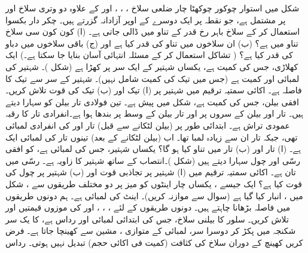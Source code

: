 شکل  میں استوار  چوکور  چوکھٹا  چار ضلعی سلاخ ، ، ، اور  کے علاوہ دو وتری سلاخ  اور  پر مشتمل ہے، جو   نقطہ  پر ایک دوسرے  کے اوپر  آزادانہ گزرتے ہیں۔ چکر دار بکسوا  استعمال کر کے سلاخ    باہر رخ   قدر کے تناو  میں ڈالی جاتی ہے۔ (ا)  کون کون سی سلاخ تناو میں ہے؟ (ب)  ان سلاخوں میں تناو کی قدر کیا ہے اور (ج)  باقی سلاخوں میں  دباو کی قدر کیا ہے؟ ( تشاکل استعمال کر کے مسئلہ انتہائی آسان بنایا جا سکتا ہے۔)
ایک کھلاڑی، جس کی کمیت  ہے، یکساں  شہتیر کے ایک سر پر کھڑا ہے (شکل )۔ شہتیر کی
 لمبائی  اور کمیت  ہے (جس میں  تیک کی کمیت شامل نہیں)۔ شہتیر کے سر سے تیک کا فاصلہ  ہے۔  اکائی سمتیہ ترقیم میں  شہتیر پر (ا) تیک  اور (ب) تیک  کی قوت تلاش کریں۔
افقی  بیلن، جس کی کمیت  ہے، شکل  میں پیش ہے۔ تین فولادی تار  بیلن کو سہارا دیتے ہیں۔ تار  اور   بیلن کے سروں پر   اور تار  بیلن کے وسط پر بندھا ہوا ہے۔انفرادی تار کا رقبہ عمودی تراش  ہے۔ ابتدائی طور پر (بیلن لٹکانے سے قبل) تار  اور  کی  انفرادی  لمبائی   تھی، جبکہ تار  ان سے  زیادہ لمبا تھا۔ اب (بیلن لٹکانے کے بعد) تینوں تار کی لمبائی ایک ہے۔ (ا) تار  اور (ب) تار  میں تناو کیا ہو گا؟
یکساں شہتیر، جس کی لمبائی  ہے، کو افقی رسّی اور چول سہارا دیتے ہیں (شکل )۔انتصاب کے ساتھ شہتیر کا زاویہ  ہے۔ رسّی میں تان   ہے۔ اکائی سمتیہ ترقیم میں (ا) شہتیر پر تجاذبی قوت  اور (ب)  شہتیر پر چول کی قوت کیا ہے؟
ایک جیسے ،  یکساں  چار اینٹوں کو میز پر دو مختلف طریقوں سے  ، شکل   میں  ، انبار کیا  گیا ہے (سوال  سے موازنہ کریں)۔ اینٹ کی لمبائی  ہے۔ ہم  دونوں طریقوں میں فاصلہ  بڑھانا چاہتے ہیں۔ دونوں طریقوں کے لئے ، ، ، اور  کی  موزوں قیمتیں   اور   تلاش کریں۔
سلور کا بیلنی سلاخ، جس کی ابتدائی لمبائی  اور رداس  ہے، کا یک سر  شکنجہ میں پکڑ کر دوسرا سر، لمبائی کے متوازی ،  مشین سے  کھینچا جاتا ہے۔ فرض کریں  کھینچ کے دوران سلاخ کی کثافت (کمیت فی اکائی حجم)  تبدیل نہیں ہوتی۔ رداس
